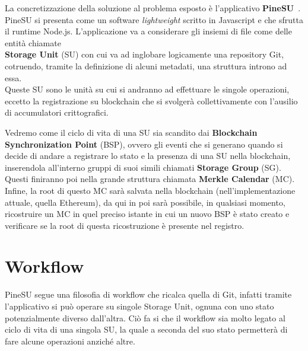 
La concretizzazione della soluzione al problema esposto è l'applicativo \textbf{PineSU}~\cite{pinesu-github-21}. \\
PineSU si presenta come un software \emph{lightweight} scritto in Javascript e che sfrutta il runtime Node.js.
L'applicazione va a considerare gli insiemi di file come delle entità chiamate \\
\textbf{Storage Unit} (SU) con cui va ad inglobare logicamente una repository Git, cotruendo,
tramite la definizione di alcuni metadati, una struttura introno ad essa. \\
Queste SU sono le unità su cui si andranno ad effettuare le singole
operazioni, eccetto la registrazione su blockchain che si svolgerà collettivamente con l'ausilio di accumulatori crittografici. 

Vedremo come il ciclo di vita di una SU sia scandito dai \textbf{Blockchain Synchronization Point} (BSP),
ovvero gli eventi che si generano quando si decide di andare a registrare lo stato e la presenza di una SU nella blockchain, inserendola
all'interno gruppi di suoi simili chiamati \textbf{Storage Group} (SG). Questi finiranno poi nella grande struttura chiamata \textbf{Merkle Calendar} (MC).
Infine, la root di questo MC sarà salvata nella blockchain (nell'implementazione attuale, quella Ethereum), da qui in poi sarà possibile, in qualsiasi momento, ricostruire un MC in quel preciso istante in cui un nuovo BSP è stato creato e verificare se la root di questa ricostruzione è presente nel registro.

\section{Workflow}
\label{sec:work}

PineSU segue una filosofia di workflow che ricalca quella di Git,
infatti tramite l'applicativo si può operare su singole Storage Unit, ognuna con uno stato potenzialmente
diverso dall'altra. Ciò fa si che il workflow sia molto legato al ciclo di vita di una singola SU, la quale
a seconda del suo stato permetterà di fare alcune operazioni anziché altre.

